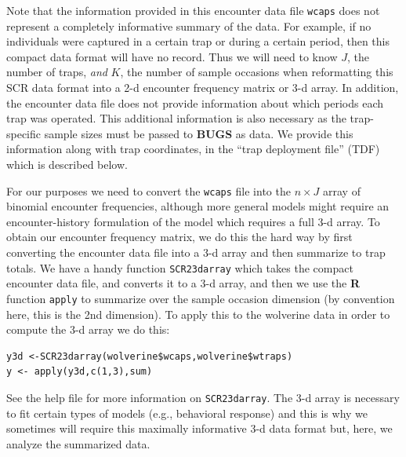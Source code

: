 Note that the information provided in this encounter data file
\mbox{\tt wcaps} does not represent a completely informative summary
of the data. For example, if no individuals were captured in a certain
trap or during a certain period, then this compact data format will
have no record. Thus we will need to know $J$, the number of traps,
{\it and} $K$, the number of sample occasions
when reformatting this SCR data format into a 2-d
encounter frequency matrix or 3-d array. In addition, the encounter
data file does not provide information about which periods each trap
was operated. This additional information is also necessary as the
trap-specific sample sizes must be passed to {\bf BUGS} as data. We
provide this information along with trap
coordinates, in the ``trap deployment file'' (TDF)
 which is described below.

For our purposes we need to convert the \mbox{\tt wcaps} file into the
 $n \times J$ array of
binomial encounter frequencies, although more general models might
require an encounter-history formulation of the model which requires a
full 3-d array.  To obtain our encounter frequency matrix, we do this
the hard way by first converting the encounter data file into a 3-d
array and then summarize to trap totals. We have a handy function
\mbox{\tt SCR23darray} which takes the compact encounter data file,
and
converts it to a 3-d array, and then we use the {\bf R} function
\mbox{\tt apply} to summarize over the sample occasion dimension (by
convention here, this is the 2nd dimension). To apply this to the
wolverine data in order to compute the 3-d array we do this:
{\small
\begin{verbatim}
y3d <-SCR23darray(wolverine$wcaps,wolverine$wtraps)
y <- apply(y3d,c(1,3),sum)
\end{verbatim}
}
See the help file for more information on \mbox{\tt SCR23darray}.
The 3-d array is necessary to fit certain types of models (e.g.,
behavioral response) and this is why we sometimes will require this
maximally informative 3-d data format but, here, we analyze the
summarized data.


